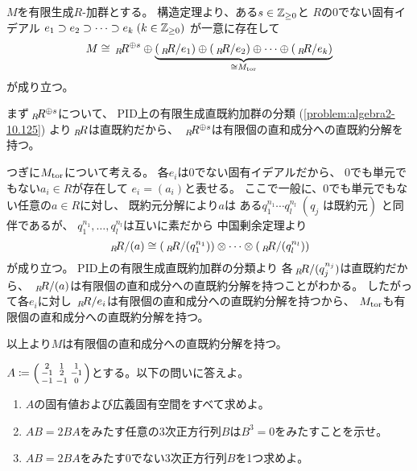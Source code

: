 \documentclass[report]{jlreq}
\begin{document}
\begin{answer}
    $M$を有限生成$R$-加群とする。
    構造定理より、ある$s \in \mathbb{Z}_{\ge 0}$と
    $R$の$0$でない固有イデアル
    $e_1 \supset e_2 \supset \cdots \supset e_k \; (k \in \mathbb{Z}_{\ge 0})$
    が一意に存在して
    \begin{equation}
        M \cong \,{}_{R}\!R^{\oplus s}
            \oplus \underbrace{
                (\,{}_{R}\!R / e_1)
                \oplus (\,{}_{R}\!R / e_2)
                \oplus \cdots
                \oplus (\,{}_{R}\!R / e_k)
            }_{\cong M_{\mathrm{tor}}}
    \end{equation}
    が成り立つ。

    まず$\,{}_{R}\!R^{\oplus s}$について、
    PID上の有限生成直既約加群の分類
    (\cref{problem:algebra2-10.125})
    より$\,{}_{R}\!R$は直既約だから、
    $\,{}_{R}\!R^{\oplus s}$は有限個の直和成分への直既約分解を持つ。

    つぎに$M_{\mathrm{tor}}$について考える。
    各$e_i$は$0$でない固有イデアルだから、
    $0$でも単元でもない$a_i \in R$が存在して
    $e_i = (a_i)$と表せる。
    ここで一般に、$0$でも単元でもない任意の$a \in R$に対し、
    既約元分解により$a$は
    ある$q_1^{n_1} \cdots q_l^{n_l} \; (q_j \text{ は既約元})$
    と同伴であるが、
    $q_1^{n_1}, \dots, q_l^{n_l}$は互いに素だから
    中国剰余定理より
    \begin{equation}
        \,{}_{R}\!R / (a)
            \cong (\,{}_{R}\!R / (q_1^{n_1}))
            \otimes \cdots
            \otimes (\,{}_{R}\!R / (q_l^{n_l}))
    \end{equation}
    が成り立つ。
    PID上の有限生成直既約加群の分類より
    各$\,{}_{R}\!R / (q_j^{n_j})$は直既約だから、
    $\,{}_{R}\!R / (a)$は有限個の直和成分への直既約分解を持つことがわかる。
    したがって各$e_i$に対し
    $\,{}_{R}\!R / e_i$は有限個の直和成分への直既約分解を持つから、
    $M_{\mathrm{tor}}$も有限個の直和成分への直既約分解を持つ。

    以上より$M$は有限個の直和成分への直既約分解を持つ。
\end{answer}

\begin{problem}[東大数理 2007A]
    $A \coloneqq \left({
        \begin{smallmatrix}
            2 & 1 & 1 \\
            -1 & 2 & -1 \\
            -1 & -1 & 0
        \end{smallmatrix}
    }\right)$とする。以下の問いに答えよ。
    \begin{enumerate}
        \item $A$の固有値および広義固有空間をすべて求めよ。
        \item $AB = 2BA$をみたす任意の3次正方行列$B$は$B^3 = 0$をみたすことを示せ。
        \item $AB = 2BA$をみたす$0$でない3次正方行列$B$を1つ求めよ。
    \end{enumerate}
\end{problem}
\end{document}
